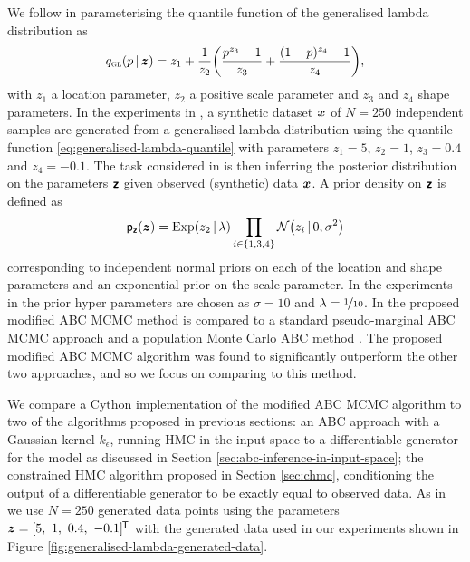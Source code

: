 We follow \citep{mcvinish2012improving} in parameterising the quantile function of the generalised lambda distribution as
\begin{equation}\label{eq:generalised-lambda-quantile}
  q_{\textsc{gl}}(p \gvn \vct{z}) = 
  z_1 + \frac{1}{z_2}\lpa \frac{p^{z_3} - 1}{z_3} + \frac{(1 - p)^{z_4} - 1}{z_4} \rpa,
\end{equation}
with $z_1$ a location parameter, $z_2$ a positive scale parameter and $z_3$ and $z_4$ shape parameters. In the experiments in \citep{mcvinish2012improving}, a synthetic dataset $\boldsymbol{x}$ of $N=250$ independent samples are generated from a generalised lambda distribution using the quantile function \eqref{eq:generalised-lambda-quantile} with parameters $z_1 = 5$, $z_2 = 1$, $z_3 = 0.4$ and $z_4 = -0.1$. The task considered in \citep{mcvinish2012improving} is then inferring the posterior distribution on the parameters $\boldsymbol{\mathsf{z}}$ given observed (synthetic) data $\boldsymbol{x}$. A prior density on $\boldsymbol{\mathsf{z}}$ is defined as
\begin{equation}\label{eq:generalised-lambda-param-prior}
  \pden{\rvct{z}}(\vct{z}) = \textrm{Exp}(z_2\gvn\lambda) \prod_{i \in \fset{1,3,4}} \nrm{z_i \gvn 0, \sigma^2}
\end{equation}
corresponding to independent normal priors on each of the location and shape parameters and an exponential prior on the scale parameter. In the experiments in \citep{mcvinish2012improving} the prior hyper parameters are chosen as $\sigma = 10$ and $\lambda = \nicefrac{1}{10}$. In \citep{mcvinish2012improving} the proposed modified \ac{ABC} \ac{MCMC} method is compared to a standard pseudo-marginal \ac{ABC} \ac{MCMC} approach and a population Monte Carlo \ac{ABC} method \citep{beaumont2009adaptive}. The proposed modified \ac{ABC} \ac{MCMC} algorithm was found to significantly outperform the other two approaches, and so we focus on comparing to this method.

We compare a Cython \citep{behnel2011cython} implementation of the modified \ac{ABC} \ac{MCMC} algorithm to two of the algorithms proposed in previous sections: an \ac{ABC} approach with a Gaussian kernel $k_\epsilon$, running \ac{HMC} in the input space to a differentiable generator for the model as discussed in Section \ref{sec:abc-inference-in-input-space}; the constrained \ac{HMC} algorithm proposed in Section \ref{sec:chmc}, conditioning the output of a differentiable generator to be exactly equal to observed data. As in \citep{mcvinish2012improving} we use $N=250$ generated data points using the parameters $\boldsymbol{z} = [5,~1,~0.4,~-0.1]^{\mkern-1.5mu\mathsf{T}}$ with the generated data used in our experiments shown in Figure \ref{fig:generalised-lambda-generated-data}. 

